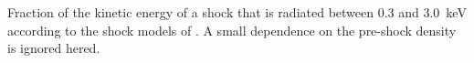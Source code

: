 \label{fig:fracxray}
Fraction of the kinetic energy of a shock that is radiated between 0.3 and 3.0~keV according to the shock models of . A small dependence on the pre-shock density is ignored hered.
